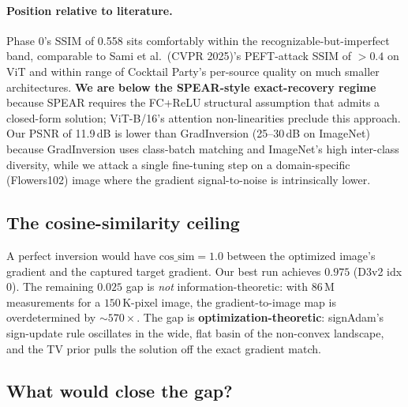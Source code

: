 \documentclass[11pt,a4paper]{article}
\begin{document}
\paragraph{Position relative to literature.} Phase 0's SSIM of 0.558 sits comfortably within the recognizable-but-imperfect band, comparable to Sami et al.\ (CVPR 2025)'s PEFT-attack SSIM of $> 0.4$ on ViT and within range of Cocktail Party's per-source quality on much smaller architectures. \textbf{We are below the SPEAR-style exact-recovery regime} because SPEAR requires the FC+ReLU structural assumption that admits a closed-form solution; ViT-B/16's attention non-linearities preclude this approach. Our PSNR of 11.9\,dB is lower than GradInversion (25--30\,dB on ImageNet) because GradInversion uses class-batch matching and ImageNet's high inter-class diversity, while we attack a single fine-tuning step on a domain-specific (Flowers102) image where the gradient signal-to-noise is intrinsically lower.

\subsection{The cosine-similarity ceiling}

\begin{insightbox}
A perfect inversion would have $\mathrm{cos\_sim} = 1.0$ between the optimized image's gradient and the captured target gradient. Our best run achieves $0.975$ (D3v2 idx 0). The remaining $0.025$ gap is \emph{not} information-theoretic: with $86\,\text{M}$ measurements for a $150\,\text{K}$-pixel image, the gradient-to-image map is overdetermined by $\sim$$570\times$. The gap is \textbf{optimization-theoretic}: signAdam's sign-update rule oscillates in the wide, flat basin of the non-convex landscape, and the TV prior pulls the solution off the exact gradient match.
\end{insightbox}

\subsection{What would close the gap?}
\end{document}
